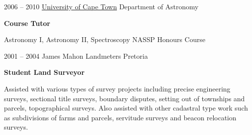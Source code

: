 \documentclass[]{friggeri-cv} %
\begin{document}
\begin{entrylist}
%
\entry
{2006 -- 2010}
{\href{http://www.uct.ac.za}{University of Cape Town}}
{Department of Astronomy}
{%
\textbf{Course Tutor}

Astronomy I, Astronomy II, Spectroscopy NASSP Honours Course
}
\end{entrylist}
\begin{entrylist}
%
\entry
{2001 -- 2004}
{\textcolor{maroonsblue}{James Mahon Landmeters}}
{Pretoria}
{%
\textbf{Student Land Surveyor}

Assisted with various types of survey projects including precise engineering surveys, sectional title surveys, boundary disputes, setting out of townships and parcels, topographical surveys. Also assisted with other cadastral type work such as subdivisions of farms and parcels, servitude surveys and beacon relocation surveys. 
}
\end{entrylist}
\pagebreak

\end{document}
